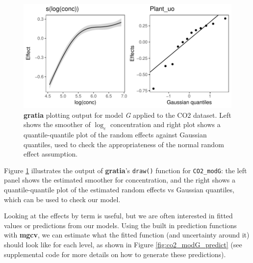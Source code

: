 \documentclass[12pt]{article}
\begin{document}
\begin{figure}
\centering
\includegraphics{../figures/co2_modG-1.pdf}
\caption{\label{fig:co2_modG}\textbf{gratia} plotting output for model
\emph{G} applied to the CO2 dataset. Left shows the smoother of
\(\log_e\) concentration and right plot shows a quantile-quantile plot
of the random effects against Gaussian quantiles, used to check the
appropriateness of the normal random effect assumption.}
\end{figure}

Figure \ref{fig:co2_modG} illustrates the output of \textbf{gratia}'s
\texttt{draw()} function for \texttt{CO2\_modG}: the left panel shows
the estimated smoother for concentration, and the right shows a
quantile-quantile plot of the estimated random effects vs Gaussian
quantiles, which can be used to check our model.

Looking at the effects by term is useful, but we are often interested in
fitted values or predictions from our models. Using the built in
prediction functions with \textbf{mgcv}, we can estimate what the fitted
function (and uncertainty around it) should look like for each level, as
shown in Figure \ref{fig:co2_modG_predict} (see supplemental code for
more details on how to generate these predictions).
\end{document}
